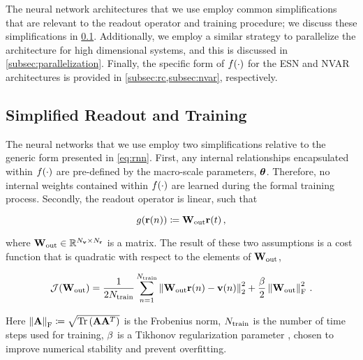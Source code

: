 The neural network architectures that we use employ common
simplifications that are relevant to the readout operator and training
procedure; we discuss these simplifications in \cref{subsec:readout}.
Additionally, we employ a similar strategy to parallelize the architecture for
high dimensional systems, and this is discussed in
\cref{subsec:parallelization}.
Finally, the specific form of $f(\cdot)$ for the ESN and NVAR architectures
is provided in \cref{subsec:rc,subsec:nvar},
respectively.


\subsection{Simplified Readout and Training}
\label{subsec:readout}

The neural networks that we use employ two
simplifications relative to the generic form presented in
\cref{eq:rnn}.
First, any internal relationships encapsulated within
$f(\cdot)$ are pre-defined by the macro-scale parameters,
$\bm{\theta}$.
Therefore, no internal weights contained within $f(\cdot)$
are learned during the formal training process.
Secondly, the readout operator is linear, such that
\begin{linenomath*}\begin{equation*}
    g(\mathbf{r}(n)) \coloneqq \mathbf{W}_\text{out} \mathbf{r}(t) \, ,
\end{equation*}\end{linenomath*}
where $\mathbf{W}_\text{out} \in \mathbb{R}^{N_{\mathbf{v}}\times N_{\mathbf{r}}}$ is a matrix.
The result of these two assumptions is a cost function that is quadratic with
respect to the elements of $\mathbf{W}_\text{out}$,
\begin{linenomath*}\begin{equation}
    \mathcal{J}(\mathbf{W}_\text{out}) =
        \dfrac{1}{2N_\text{train}}\sum_{n=1}^{N_\text{train}}
        \left\lVert\mathbf{W}_\text{out} \mathbf{r}(n) - \mathbf{v}(n)\right\rVert^2_2
        +
        \dfrac{\beta}{2}\left\lVert\mathbf{W}_\text{out}\right\rVert_\text{F}^2 \, .
    \label{eq:cost}
\end{equation}\end{linenomath*}
Here
$\left\lVert\mathbf{A}\right\rVert_\text{F} \coloneqq
\sqrt{\text{Tr}\left(\mathbf{A}\mathbf{A}^T\right)}$
is the Frobenius norm,
$N_\text{train}$ is the number of time steps used for training,
$\beta$ is a Tikhonov regularization parameter \citep{tikhonov_solution_1963}, chosen to improve
numerical stability and prevent overfitting.

